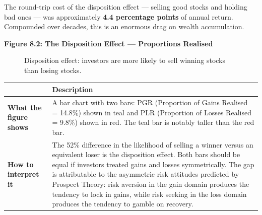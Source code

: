 \documentclass[12pt, letterpaper]{article}
\begin{document}
The round-trip cost of the disposition effect --- selling good stocks and holding bad ones --- was approximately \textbf{4.4 percentage points} of annual return. Compounded over decades, this is an enormous drag on wealth accumulation.

\textbf{Figure 8.2: The Disposition Effect --- Proportions Realised}

\begin{figure}[ht]
\centering


\caption{Disposition effect: investors are more likely to sell winning stocks than losing stocks.}
\label{fig:disposition_effect}

\end{figure}


\begin{table}[H]
\centering
\small
\begin{tabularx}{\linewidth}{lY}
\toprule
 & Description \\
\midrule
\textbf{What the figure shows} & A bar chart with two bars: PGR (Proportion of Gains Realised = 14.8\%) shown in teal and PLR (Proportion of Losses Realised = 9.8\%) shown in red. The teal bar is notably taller than the red bar. \\
\textbf{How to interpret it} & The 52\% difference in the likelihood of selling a winner versus an equivalent loser is the disposition effect. Both bars should be equal if investors treated gains and losses symmetrically. The gap is attributable to the asymmetric risk attitudes predicted by Prospect Theory: risk aversion in the gain domain produces the tendency to lock in gains, while risk seeking in the loss domain produces the tendency to gamble on recovery. \\
\bottomrule
\end{tabularx}
\end{table}
\end{document}
